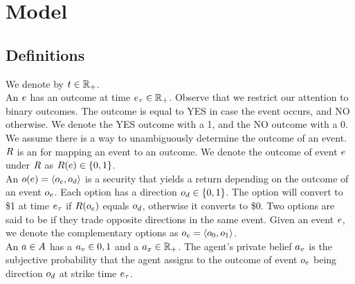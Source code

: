 \section{Model}

\subsection{Definitions}

We denote  by $t\in\mathbb{R}_+$. \\

An  $e$ has an outcome at time $e_\tau \in \mathbb{R}_+$. 
Observe that we restrict our attention to binary outcomes. 
The outcome is equal to YES in case the event occurs, and NO otherwise. 
We denote the YES outcome with a 1, and the NO outcome with a 0.
We assume there is a way to unambiguously determine the outcome of an event. \\

$R$ is an  for mapping an event to an outcome.
We denote the outcome of event $e$ under $R$ as 
$R(e) \in \{0,1\}$.\\

An  $o(e) = \left<o_e, o_d\right>$ is a security that yields a return depending on 
the outcome of an event $o_e$. Each option has a direction 
$o_d \in \{0, 1\}$. 
The option will convert to \$1 at time $e_\tau$ if $R(o_e)$ equals 
$o_d$, otherwise it converts to \$0. Two options are said to be
 if they trade opposite directions in the same event. Given an
event $e$, we denote the complementary options as 
$o_e = \left<o_{0}, o_{1}\right>$.\\


An  $a\in A$ has a  
$a_v \in {0,1}$ 
and a  $a_x \in \mathbb{R}_+$.
The agent's private belief $a_v$ 
is the subjective probability that the agent
assigns to the outcome of event $o_e$ being direction $o_d$
at strike time $e_\tau$. \\


